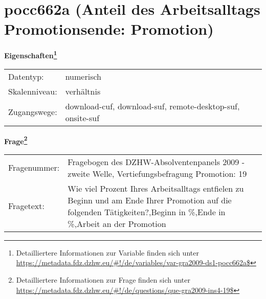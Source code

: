 
    \setcounter{footnote}{0}

    \vspace*{-1.8cm}
	\section{pocc662a (Anteil des Arbeitsalltags Promotionsende: Promotion)}
	\label{section:pocc662a}



    \vspace*{0.5cm}
    \noindent\textbf{Eigenschaften\footnote{Detailliertere Informationen zur Variable finden sich unter
		\url{https://metadata.fdz.dzhw.eu/\#!/de/variables/var-gra2009-ds1-pocc662a$}}}\\
	\begin{tabularx}{\hsize}{@{}lX}
	Datentyp: & numerisch \\
	Skalenniveau: & verhältnis \\
	Zugangswege: &
	  download-cuf, 
	  download-suf, 
	  remote-desktop-suf, 
	  onsite-suf
 \\
    \end{tabularx}



				\vspace*{0.5cm}
                \noindent\textbf{Frage\footnote{Detailliertere Informationen zur Frage finden sich unter
		              \url{https://metadata.fdz.dzhw.eu/\#!/de/questions/que-gra2009-ins4-19$}}}\\
				\begin{tabularx}{\hsize}{@{}lX}
					Fragenummer: &
					  Fragebogen des DZHW-Absolventenpanels 2009 - zweite Welle, Vertiefungsbefragung Promotion:
					  19
 \\
					Fragetext: & Wie viel Prozent Ihres Arbeitsalltags entfielen zu Beginn und am Ende Ihrer Promotion auf die folgenden Tätigkeiten?,Beginn in \%,Ende in \%,Arbeit an der Promotion \\
				\end{tabularx}





